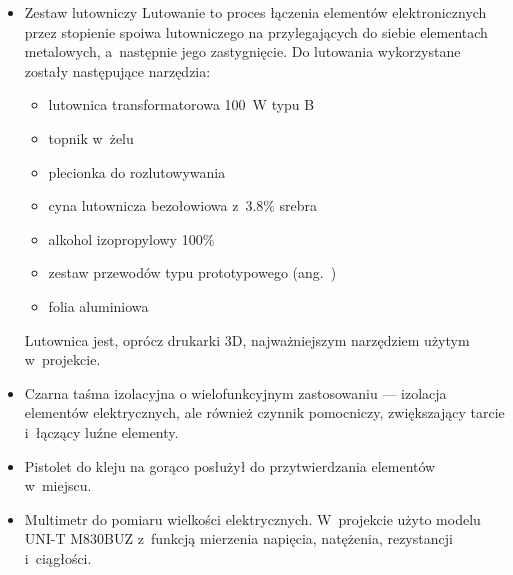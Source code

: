 \begin{itemize}
    \item Zestaw lutowniczy 
    Lutowanie to proces łączenia elementów elektronicznych przez stopienie spoiwa lutowniczego na przylegających do siebie elementach metalowych, a~następnie jego zastygnięcie. Do lutowania wykorzystane zostały następujące narzędzia:

    \begin{itemize}
        \item lutownica transformatorowa 100~W typu B %
        \item topnik w~żelu
        \item plecionka do rozlutowywania
        \item cyna lutownicza bezołowiowa z~3.8\% srebra
        \item alkohol izopropylowy 100\%
        \item zestaw przewodów typu prototypowego (ang.~)
        \item folia aluminiowa
    \end{itemize}

    Lutownica jest, oprócz drukarki 3D, najważniejszym narzędziem użytym w~projekcie.

    \item Czarna taśma izolacyjna o wielofunkcyjnym zastosowaniu --- izolacja elementów elektrycznych, ale również czynnik pomocniczy, zwiększający tarcie i~łączący luźne elementy.

    \item Pistolet do kleju na gorąco posłużył do przytwierdzania elementów w~miejscu.

    \item Multimetr do pomiaru wielkości elektrycznych. W~projekcie użyto modelu UNI-T M830BUZ z~funkcją mierzenia napięcia, natężenia, rezystancji i~ciągłości.


\end{itemize}

